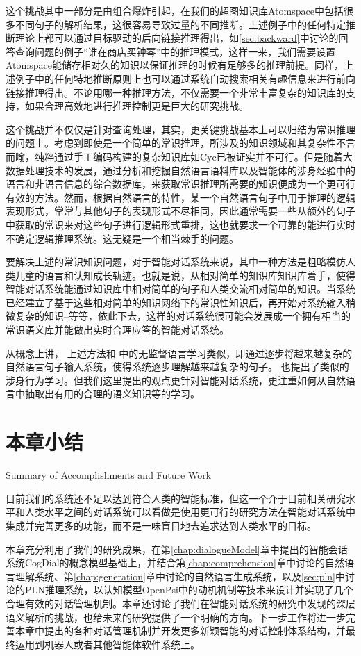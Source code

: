 这个挑战其中一部分是由组合爆炸引起，在我们的超图知识库Atomspace中包括很多不同句子的解析结果，这很容易导致过量的不同推断。上述例子中的任何特定推断理论上都可以通过目标驱动的后向链接推理得出，如\ref{sec:backward}中讨论的回答查询问题的例子“谁在商店买钟琴”中的推理模式，这样一来，我们需要设置Atomspace能储存相对久的知识以保证推理的时候有足够多的推理前提。同样，上述例子中的任何特地推断原则上也可以通过系统自动搜索相关有趣信息来进行前向链接推理得出。不论用哪一种推理方法，不仅需要一个非常丰富复杂的知识库的支持，如果合理高效地进行推理控制更是巨大的研究挑战。

这个挑战并不仅仅是针对查询处理，其实，更关键挑战基本上可以归结为常识推理的问题上\cite{RWR}。考虑到即使是一个简单的常识推理，所涉及的知识领域和其复杂性不言而喻，纯粹通过手工编码构建的复杂知识库如Cyc\cite{Lenat1990}已被证实并不可行。但是随着大数据处理技术的发展，通过分析和挖掘自然语言语料库以及智能体的涉身经验中的语言和非语言信息的综合数据库，来获取常识推理所需要的知识便成为一个更可行有效的方法。然而，根据自然语言的特性，某一个自然语言句子中用于推理的逻辑表现形式，常常与其他句子的表现形式不尽相同，因此通常需要一些从额外的句子中获取的常识来对这些句子进行逻辑形式重排，这也就要求一个可靠的能进行实时不确定逻辑推理系统。这无疑是一个相当棘手的问题。

要解决上述的常识知识问题，对于智能对话系统来说，其中一种方法是粗略模仿人类儿童的语言和认知成长轨迹。也就是说，从相对简单的知识库知识库着手，使得智能对话系统能通过知识库中相对简单的句子和人类交流相对简单的知识。当系统已经建立了基于这些相对简单的知识网络下的常识性知识后，再开始对系统输入稍微复杂的知识--等等，依此下去，这样的对话系统很可能会发展成一个拥有相当的常识语义库并能做出实时合理应答的智能对话系统。

 从概念上讲， 上述方法和\cite{Spitkovsky2013} 中的无监督语言学习类似，即通过逐步将越来越复杂的自然语言句子输入系统，使得系统逐步理解越来越复杂的句子。 \cite{Goertzel2008w} 也提出了类似的涉身行为学习。但我们这里提出的观点更针对智能对话系统，更注重如何从自然语言中抽取出有用的合理的语义知识等的学习。

\section{本章小结}{Summary of Accomplishments and Future Work}

目前我们的系统还不足以达到符合人类的智能标准，但这一个介于目前相关研究水平和人类水平之间的对话系统可以看做是使用更可行的研究方法在智能对话系统中集成并完善更多的功能，而不是一味盲目地去追求达到人类水平的目标。

本章充分利用了我们的研究成果，在第\ref{chap:dialogueModel}章中提出的智能会话系统CogDial的概念模型基础上，并结合第\ref{chap:comprehension}章中讨论的自然语言理解系统、第\ref{chap:generation}章中讨论的自然语言生成系统，以及\ref{sec:pln}中讨论的PLN推理系统，以认知模型OpenPsi中的动机机制等技术来设计并实现了几个合理有效的对话管理机制。本章还讨论了我们在智能对话系统的研究中发现的深层语义解析的挑战，也给未来的研究提供了一个明确的方向。下一步工作将进一步完善本章中提出的各种对话管理机制并开发更多新颖智能的对话控制体系结构，并最终运用到机器人或者其他智能体软件系统上。


